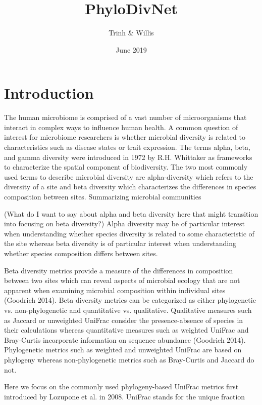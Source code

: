 \documentclass{article}
\title{PhyloDivNet}
\author{Trinh & Willis}
\date{June 2019}
\begin{document}
\maketitle
\section{Introduction}
The human microbiome is comprised of a vast number of microorganisms that interact in complex ways to influence human health. A common question of interest for microbiome researchers is whether microbial diversity is related to characteristics such as disease states or trait expression. The terms alpha, beta, and gamma diversity were introduced in 1972 by R.H. Whittaker as frameworks to characterize the spatial component of biodiversity. The two most commonly used terms to describe microbial diversity are alpha-diversity which refers to the diversity of a site and beta diversity which characterizes the differences in species composition between sites. Summarizing microbial communities

(What do I want to say about alpha and beta diversity here that might transition into focusing on beta diversity?)
Alpha diversity may be of particular interest when understanding whether species diversity is related to some characteristic of the site whereas beta diversity is of particular interest when understanding whether species composition differs between sites.

Beta diversity metrics provide a measure of the differences in composition between two sites which can reveal aspects of microbial ecology that are not apparent when examining microbial composition within individual sites (Goodrich 2014). Beta diversity metrics can be categorized as either phylogenetic vs. non-phylogenetic and quantitative vs. qualitative. Qualitative measures such as Jaccard or unweighted UniFrac consider the presence-absence of species in their calculations whereas quantitative measures such as weighted UniFrac and Bray-Curtis incorporate information on sequence abundance (Goodrich 2014). Phylogenetic metrics such as weighted and unweighted UniFrac are based on phylogeny whereas non-phylogenetic metrics such as Bray-Curtis and Jaccard do not.

Here we focus on the commonly used phylogeny-based UniFrac metrics first introduced by Lozupone et al. in 2008. UniFrac stands for the unique fraction
\end{document}
